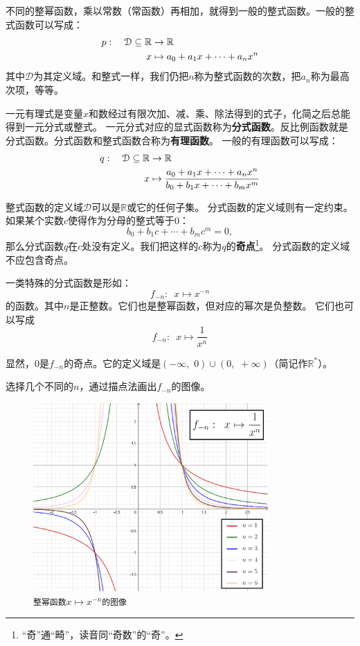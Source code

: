 \documentclass[12pt,UTF8]{ctexbook}
\begin{document}
不同的整幂函数，乘以常数（常函数）再相加，就得到一般的整式函数。一般的整式函数可以写成：
\begin{align}
    p: \quad \mathcal{D} \subseteq \mathbb{R} &\rightarrow \mathbb{R} \notag \\
    x &\mapsto a_0 + a_1 x + \cdots + a_n x^n \notag
\end{align}
其中$\mathcal{D}$为其定义域。和整式一样，我们仍把$n$称为整式函数的次数，把$a_n$称为最高次项，等等。

一元有理式是变量$x$和数经过有限次加、减、乘、除法得到的式子，化简之后总能得到一元分式或整式。
一元分式对应的显式函数称为\textbf{分式函数}。反比例函数就是分式函数。分式函数和整式函数合称为\textbf{有理函数}。
一般的有理函数可以写成：
\begin{align}
    q: \quad \mathcal{D} \subseteq \mathbb{R} &\rightarrow \mathbb{R} \notag \\
    x &\mapsto \frac{a_0 + a_1 x + \cdots + a_n x^n}{b_0 + b_1x + \cdots + b_mx^m} \notag
\end{align}

整式函数的定义域$\mathcal{D}$可以是$\mathbb{R}$或它的任何子集。
分式函数的定义域则有一定约束。如果某个实数$c$使得作为分母的整式等于$0$：
$$ b_0 + b_1c + \cdots + b_m c^m = 0, $$
那么分式函数$q$在$c$处没有定义。我们把这样的$c$称为$q$的\textbf{奇点}\footnote{“奇”通“畸”，读音同“奇数”的“奇”。}。
分式函数的定义域不应包含奇点。

一类特殊的分式函数是形如：
$$ f_{-n} : \,\,\, x \mapsto x^{-n}$$
的函数。其中$n$是正整数。它们也是整幂函数，但对应的幂次是负整数。
它们也可以写成
$$ f_{-n} : \,\,\, x \mapsto \frac{1}{x^n}$$

显然，$0$是$f_{-n}$的奇点。它的定义域是$(-\infty,\,\, 0)\cup(0, \,\, +\infty)$（简记作$\mathbb{R}^*$）。

选择几个不同的$n$，通过描点法画出$f_{-n}$的图像。

\begin{figure}[h]
    \vspace{4pt}
    \centering
    \includegraphics[width=0.8\textwidth]{整幂函数2.png}
    \caption*{\texttt{整幂函数}$x\mapsto x^{-n}$\texttt{的图像}}
\end{figure}
\end{document}
